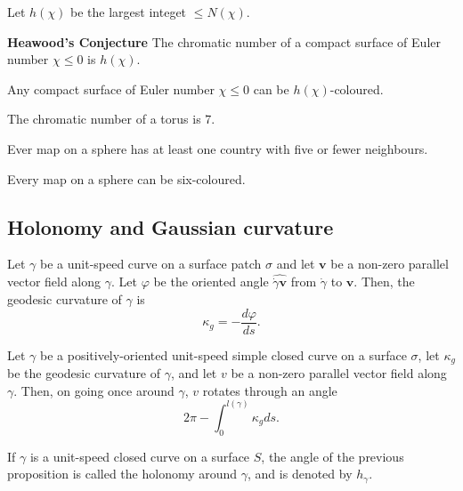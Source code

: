Let $h(\chi)$ be the largest integet $\leq N(\chi)$.

\noindent\textbf{Heawood's Conjecture} The chromatic number of a compact surface of Euler number
$\chi \leq 0$ is $h(\chi)$.

\begin{theorem}
  Any compact surface of Euler number $\chi \leq 0$ can be $h(\chi)$-coloured.
\end{theorem}

\begin{theorem}
  The chromatic number of a torus is $7$.
\end{theorem}

\begin{proposition}
  Ever map on a sphere has at least one country with five or fewer neighbours.
\end{proposition}

\begin{corollary}
  Every map on a sphere can be six-coloured.
\end{corollary}

\subsection{Holonomy and Gaussian curvature}

\begin{proposition}
  Let $\gamma$ be a unit-speed curve on a surface patch $\sigma$ and let $\bm{v}$ be a non-zero
  parallel vector field along $\gamma$. Let $\varphi$ be the oriented angle $\widehat{\dot{\gamma}\bm{v}}$
  from $\dot{\gamma}$ to $\bm{v}$. Then, the geodesic curvature of $\gamma$ is
  \[
    \kappa_g = -\frac{d\varphi}{ds}.
  \]
\end{proposition}

\begin{proposition}
  Let $\gamma$ be a positively-oriented unit-speed simple closed curve on a surface $\sigma$,
  let $\kappa_g$ be the geodesic curvature of $\gamma$, and let $v$ be a non-zero parallel vector
  field along $\gamma$. Then, on going once around $\gamma$, $v$ rotates through an angle
  \[
    2\pi - \int_0^{l(\gamma)} \kappa_g ds.
  \]
\end{proposition}

\begin{defn}
  If $\gamma$ is a unit-speed closed curve on a surface $S$, the angle of the previous proposition
  is called the holonomy around $\gamma$, and is denoted by $h_{\gamma}$.
\end{defn}

